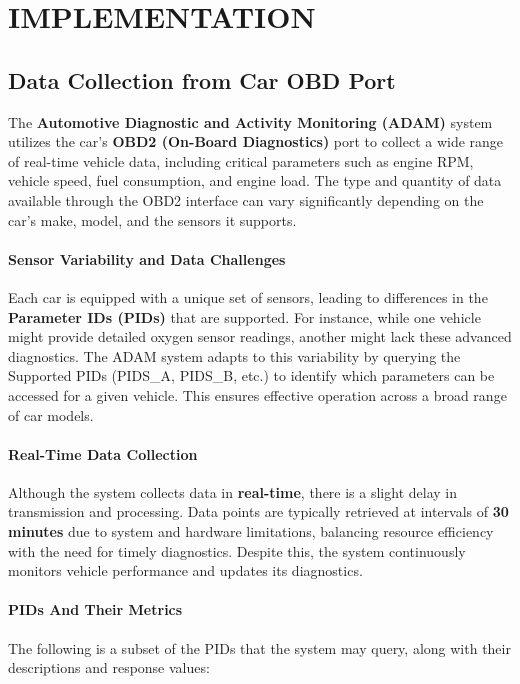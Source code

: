 \chapter{IMPLEMENTATION}
\justify
\section{Data Collection from Car OBD Port}
The \textbf{Automotive Diagnostic and Activity Monitoring (ADAM)} system utilizes the car's \textbf{OBD2 (On-Board Diagnostics)} port to collect a wide range of real-time vehicle data, including critical parameters such as engine RPM, vehicle speed, fuel consumption, and engine load. The type and quantity of data available through the OBD2 interface can vary significantly depending on the car's make, model, and the sensors it supports.

\subsubsection{Sensor Variability and Data Challenges}
Each car is equipped with a unique set of sensors, leading to differences in the \textbf{Parameter IDs (PIDs)} that are supported. For instance, while one vehicle might provide detailed oxygen sensor readings, another might lack these advanced diagnostics. The ADAM system adapts to this variability by querying the Supported PIDs (PIDS\_A, PIDS\_B, etc.) to identify which parameters can be accessed for a given vehicle. This ensures effective operation across a broad range of car models.

\subsubsection{Real-Time Data Collection}
Although the system collects data in \textbf{real-time}, there is a slight delay in transmission and processing. Data points are typically retrieved at intervals of \textbf{30 minutes} due to system and hardware limitations, balancing resource efficiency with the need for timely diagnostics. Despite this, the system continuously monitors vehicle performance and updates its diagnostics.

\subsubsection{PIDs And Their Metrics}
The following is a subset of the PIDs that the system may query, along with their descriptions and response values:

